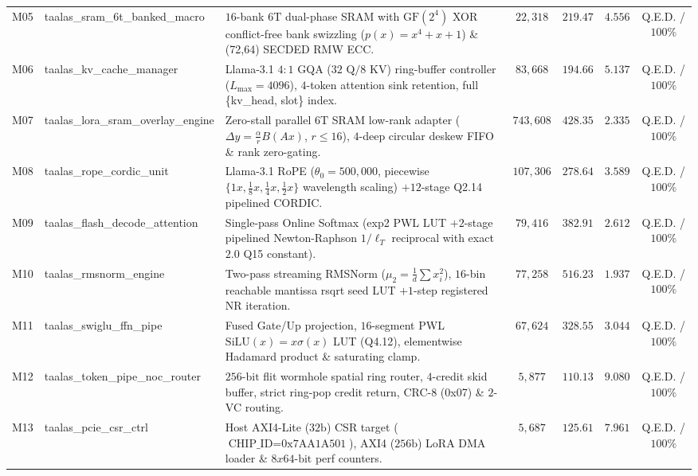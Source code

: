 \documentclass[10pt,journal,compsoc]{IEEEtran}
\def\texttt#1{#1}%
\def\times{x}%
\begin{document}
\begin{table}[!t]
{\begin{tabular}{llp{6.6cm}cccc}
\texttt{M05} & \texttt{taalas\_sram\_6t\_banked\_macro} & $16$-bank $6\text{T}$ dual-phase SRAM with $\text{GF}(2^4)$ XOR conflict-free bank swizzling ($p(x)=x^4+x+1$) \& \texttt{(72,64)} SECDED RMW ECC. & $22,318$ & $219.47$ & $4.556$ & \texttt{Q.E.D.} / $100\%$ \\
\texttt{M06} & \texttt{taalas\_kv\_cache\_manager} & Llama-3.1 $4:1$ GQA ($32\text{ Q} / 8\text{ KV}$) ring-buffer controller ($L_{\max}=4096$), $4$-token attention sink retention, full \texttt{\{kv\_head, slot\}} index. & $83,668$ & $194.66$ & $5.137$ & \texttt{Q.E.D.} / $100\%$ \\
\texttt{M07} & \texttt{taalas\_lora\_sram\_overlay\_engine} & Zero-stall parallel $6\text{T}$ SRAM low-rank adapter ($\Delta y = \frac{\alpha}{r}B(Ax)$, $r \le 16$), $4$-deep circular deskew FIFO \& rank zero-gating. & $743,608$ & $428.35$ & $2.335$ & \texttt{Q.E.D.} / $100\%$ \\
\texttt{M08} & \texttt{taalas\_rope\_cordic\_unit} & Llama-3.1 RoPE ($\theta_0=500,000$, piecewise $\{1\times, \frac{1}{8}\times, \frac{1}{4}\times, \frac{1}{2}\times\}$ wavelength scaling) $+ 12$-stage \texttt{Q2.14} pipelined CORDIC. & $107,306$ & $278.64$ & $3.589$ & \texttt{Q.E.D.} / $100\%$ \\
\texttt{M09} & \texttt{taalas\_flash\_decode\_attention} & Single-pass Online Softmax (\texttt{exp2} PWL LUT $+ 2$-stage pipelined Newton-Raphson $1/\ell_T$ reciprocal with exact $2.0$ \texttt{Q15} constant). & $79,416$ & $382.91$ & $2.612$ & \texttt{Q.E.D.} / $100\%$ \\
\texttt{M10} & \texttt{taalas\_rmsnorm\_engine} & Two-pass streaming RMSNorm ($\mu_2 = \frac{1}{d}\sum x_i^2$), $16$-bin reachable mantissa \texttt{rsqrt} seed LUT $+ 1$-step registered NR iteration. & $77,258$ & $516.23$ & $1.937$ & \texttt{Q.E.D.} / $100\%$ \\
\texttt{M11} & \texttt{taalas\_swiglu\_ffn\_pipe} & Fused Gate/Up projection, $16$-segment PWL $\text{SiLU}(x)=x\sigma(x)$ LUT (\texttt{Q4.12}), elementwise Hadamard product \& saturating clamp. & $67,624$ & $328.55$ & $3.044$ & \texttt{Q.E.D.} / $100\%$ \\
\texttt{M12} & \texttt{taalas\_token\_pipe\_noc\_router} & $256\text{-bit}$ flit wormhole spatial ring router, $4$-credit skid buffer, strict ring-pop credit return, \texttt{CRC-8} (\texttt{0x07}) \& $2$-VC routing. & $5,877$ & $110.13$ & $9.080$ & \texttt{Q.E.D.} / $100\%$ \\
\texttt{M13} & \texttt{taalas\_pcie\_csr\_ctrl} & Host \texttt{AXI4-Lite} ($32\text{b}$) CSR target ($\text{\texttt{CHIP\_ID}}=\text{\texttt{0x7AA1A501}}$), \texttt{AXI4} ($256\text{b}$) LoRA DMA loader \& $8\times 64\text{-bit}$ perf counters. & $5,687$ & $125.61$ & $7.961$ & \texttt{Q.E.D.} / $100\%$ \\

\end{tabular}}
\end{table}
\end{document}
